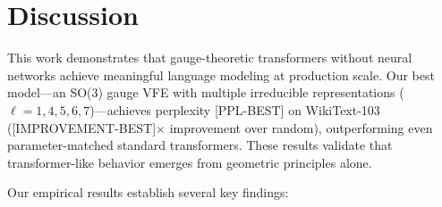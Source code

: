 \documentclass[twoside,11pt]{article}
\begin{document}
\section{Discussion}
\label{sec:discussion}

This work demonstrates that gauge-theoretic transformers without neural networks achieve meaningful language modeling at production scale. Our best model---an SO(3) gauge VFE with multiple irreducible representations ($\ell=1,4,5,6,7$)---achieves perplexity [PPL-BEST] on WikiText-103 ([IMPROVEMENT-BEST]$\times$ improvement over random), outperforming even parameter-matched standard transformers. These results validate that transformer-like behavior emerges from geometric principles alone.

Our empirical results establish several key findings:
\end{document}
